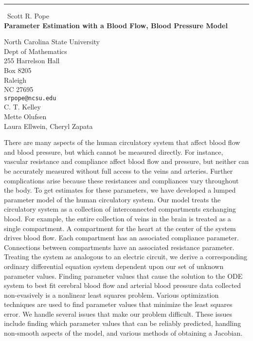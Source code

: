 \documentclass{report}
\begin{document}
\begin{center}
\rule{6in}{1pt} \
{\large Scott R. Pope \\
{\bf Parameter Estimation with a Blood Flow, Blood Pressure Model}}

North Carolina State University \\ Dept of Mathematics \\ 255 Harrelson Hall \\ Box 8205 \\ Raleigh \\ NC 27695
\\
{\tt srpope@ncsu.edu}\\
C. T. Kelley\\
Mette Olufsen\\
	Laura Ellwein, Cheryl Zapata\end{center}

There are many aspects of the human circulatory system that affect blood
flow and blood pressure, but which cannot be measured directly. For
instance, vascular resistance and compliance affect blood flow and
pressure, but neither can be accurately measured without full access to
the veins and arteries. Further complications arise because these
resistances and compliances vary throughout the body. To get estimates
for these parameters, we have developed a lumped parameter model of the
human circulatory system. Our model treats the circulatory system as a
collection of interconnected compartments exchanging blood. For example,
the entire collection of veins in the brain is treated as a single
compartment. A compartment for the heart at the center of the system
drives blood flow. Each compartment has an associated compliance
parameter. Connections between compartments have an associated resistance
parameter. Treating the system as analogous to an electric circuit, we
derive a corresponding ordinary differential equation system dependent
upon our set of unknown parameter values. Finding parameter values that
cause the solution to the ODE system to best fit cerebral blood flow and
arterial blood pressure data collected non-evasively is a nonlinear least
squares problem. Various optimization techniques are used to find
parameter values that minimize the least squares error. We handle several
issues that make our problem difficult. These issues include finding
which parameter values that can be reliably predicted, handling
non-smooth aspects of the model, and various methods of obtaining a
Jacobian.
\end{document}

